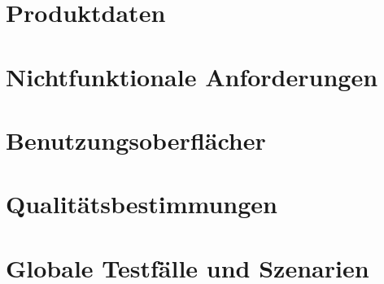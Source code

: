\documentclass[parskip=full]{scrartcl}
\begin{document}
\section{Produktdaten}

\section{Nichtfunktionale Anforderungen}

\section{Benutzungsoberflächer}

\section{Qualitätsbestimmungen}

\section{Globale Testfälle und Szenarien}
\end{document}
